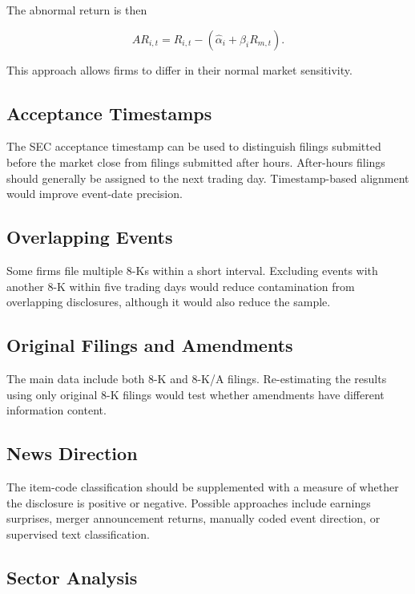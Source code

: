 \documentclass[12pt]{article}
\begin{document}
The abnormal return is then

\begin{equation}
AR_{i,t}=R_{i,t}-\left(\widehat{\alpha}_i+\widehat{\beta}_iR_{m,t}\right).
\end{equation}

This approach allows firms to differ in their normal market sensitivity.

\subsection{Acceptance Timestamps}

The SEC acceptance timestamp can be used to distinguish filings submitted before the market close from filings submitted after hours. After-hours filings should generally be assigned to the next trading day. Timestamp-based alignment would improve event-date precision.

\subsection{Overlapping Events}

Some firms file multiple 8-Ks within a short interval. Excluding events with another 8-K within five trading days would reduce contamination from overlapping disclosures, although it would also reduce the sample.

\subsection{Original Filings and Amendments}

The main data include both 8-K and 8-K/A filings. Re-estimating the results using only original 8-K filings would test whether amendments have different information content.

\subsection{News Direction}

The item-code classification should be supplemented with a measure of whether the disclosure is positive or negative. Possible approaches include earnings surprises, merger announcement returns, manually coded event direction, or supervised text classification.

\subsection{Sector Analysis}
\end{document}
